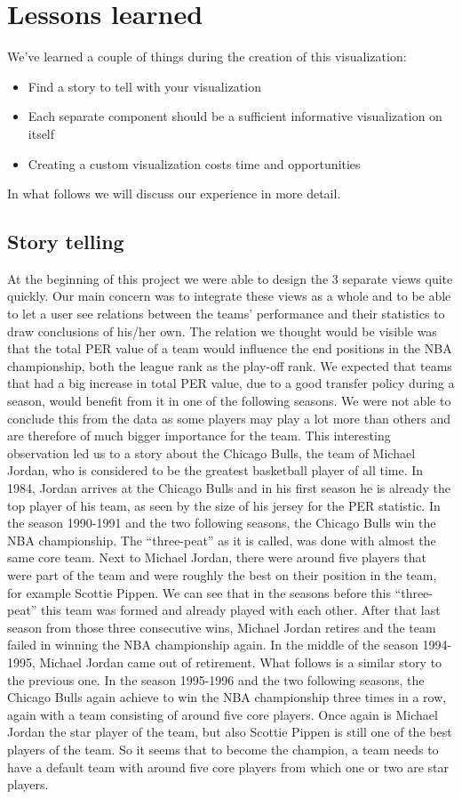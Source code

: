 \documentclass[]{sigchi}
\begin{document}
\section{Lessons learned}\label{sec:lessonslearned}
We've learned a couple of things during the creation of this visualization:
\begin{itemize}
    \item Find a story to tell with your visualization
    \item Each separate component should be a sufficient informative visualization on itself
    \item Creating a custom visualization costs time and opportunities
\end{itemize}
In what follows we will discuss our experience in more detail.

\subsection{Story telling}
At the beginning of this project we were able to design the 3 separate views
quite quickly. Our main concern was to integrate these views as a whole and to be 
able to let a user see relations between the teams' performance and their statistics to draw
conclusions of his/her own. The relation we thought would be visible 
was that the total PER value of a team would influence the end positions in the NBA championship, both the league rank as the play-off rank. We expected that teams 
that had a big increase in total PER value, due to a good transfer policy during a season, would benefit from it in one of the following seasons. We were not able to conclude this from the data as some players may play a lot more than others and are therefore of much bigger importance for the team. This interesting observation led us to a story about the Chicago Bulls, the team of Michael Jordan, who is considered to be the greatest basketball player of all time. In 1984, Jordan arrives at the Chicago Bulls and in his first season he is already the top player of his team, as seen by the size of his jersey for the PER statistic. In the season 1990-1991 and the two following seasons, the Chicago Bulls win the NBA championship. The ``three-peat'' as it is called, was done with almost the same core team. Next to Michael Jordan, there were around five players that were part of the team and were roughly the best on their position in the team, for example Scottie Pippen. We can see that in the seasons before this ``three-peat'' this team was formed and already played with each other. After that last season from those three consecutive wins, Michael Jordan retires and the team failed in winning the NBA championship again. In the middle of the season 1994-1995, Michael Jordan came out of retirement. What follows is a similar story to the previous one. In the season 1995-1996 and the two following seasons, the Chicago Bulls again achieve to win the NBA championship three times in a row, again with a  team consisting of around five core players. Once again is Michael Jordan the star player of the team, but also Scottie Pippen is still one of the best players of the team. So it seems that to become the champion, a team needs to have a default team with around five core players from which one or two are star players.
\end{document}
